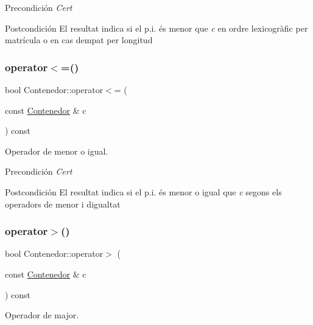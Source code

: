 \begin{DoxyPrecond}{Precondición}
{\itshape Cert} 
\end{DoxyPrecond}
\begin{DoxyPostcond}{Postcondición}
El resultat indica si el p.\+i. és menor que {\itshape c} en ordre lexicogràfic per matrícula o en cas d\textquotesingle{}empat per longitud 
\end{DoxyPostcond}
\mbox{\label{class_contenedor_a587d437b6c6973c3b7008f579c4590a4}} 
\subsubsection{\texorpdfstring{operator$<$=()}{operator<=()}}
{\footnotesize\ttfamily bool Contenedor\+::operator$<$= (\begin{DoxyParamCaption}\item[{const \hyperlink{class_contenedor}{Contenedor} \&}]{c }\end{DoxyParamCaption}) const}



Operador de menor o igual. 

\begin{DoxyPrecond}{Precondición}
{\itshape Cert} 
\end{DoxyPrecond}
\begin{DoxyPostcond}{Postcondición}
El resultat indica si el p.\+i. és menor o igual que {\itshape c} segons els operadors de menor i d\textquotesingle{}igualtat 
\end{DoxyPostcond}
\mbox{\label{class_contenedor_a9520b1def419e6d64e879ab5b594e3a8}} 
\subsubsection{\texorpdfstring{operator$>$()}{operator>()}}
{\footnotesize\ttfamily bool Contenedor\+::operator$>$ (\begin{DoxyParamCaption}\item[{const \hyperlink{class_contenedor}{Contenedor} \&}]{c }\end{DoxyParamCaption}) const}



Operador de major. 

